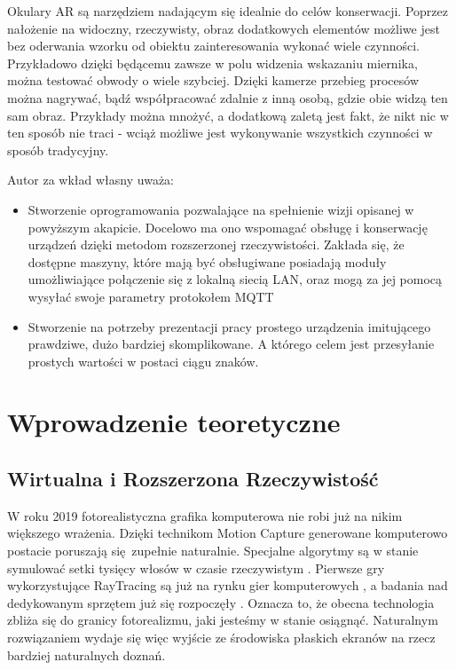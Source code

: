 \documentclass[12pt,twoside,polish]{article}
\begin{document}
Okulary AR są narzędziem nadającym się idealnie do celów konserwacji. Poprzez nałożenie na widoczny, rzeczywisty, obraz dodatkowych elementów możliwe jest bez oderwania wzorku od obiektu zainteresowania wykonać wiele czynności. Przykładowo dzięki będącemu zawsze w polu widzenia wskazaniu miernika, można testować obwody o wiele szybciej. Dzięki kamerze przebieg procesów można nagrywać, bądź współpracować zdalnie z inną osobą, gdzie obie widzą ten sam obraz. Przykłady można mnożyć, a dodatkową zaletą jest fakt, że nikt nic w ten sposób nie traci - wciąż możliwe jest wykonywanie wszystkich czynności w sposób tradycyjny.

Autor za wkład własny uważa:
\begin{itemize}
	\item Stworzenie oprogramowania pozwalające na spełnienie wizji opisanej w powyższym akapicie. Docelowo ma ono wspomagać obsługę i konserwację urządzeń dzięki metodom rozszerzonej rzeczywistości. Zakłada się, że dostępne maszyny, które mają być obsługiwane posiadają moduły umożliwiające połączenie się z lokalną siecią LAN, oraz mogą za jej pomocą wysyłać swoje parametry protokołem MQTT
	\item Stworzenie na potrzeby prezentacji pracy prostego urządzenia imitującego prawdziwe, dużo bardziej skomplikowane. A którego celem jest przesyłanie prostych wartości w postaci ciągu znaków.
\end{itemize}


\clearpage


\section{Wprowadzenie teoretyczne}

\subsection {Wirtualna i Rozszerzona Rzeczywistość}
W roku 2019 fotorealistyczna grafika komputerowa nie robi już na nikim większego wrażenia. Dzięki technikom Motion Capture generowane komputerowo postacie poruszają się zupełnie naturalnie. Specjalne algorytmy są w stanie symulować setki tysięcy włosów w czasie rzeczywistym \cite{hairworks}. Pierwsze gry wykorzystujące RayTracing są już na rynku gier komputerowych \cite{raytracinggames}, a badania nad dedykowanym sprzętem już się rozpoczęły \cite{raytracinghardware}. Oznacza to, że obecna technologia zbliża się do granicy fotorealizmu, jaki jesteśmy w stanie osiągnąć. Naturalnym rozwiązaniem wydaje się więc wyjście ze środowiska płaskich ekranów na rzecz bardziej naturalnych doznań.
\end{document}
